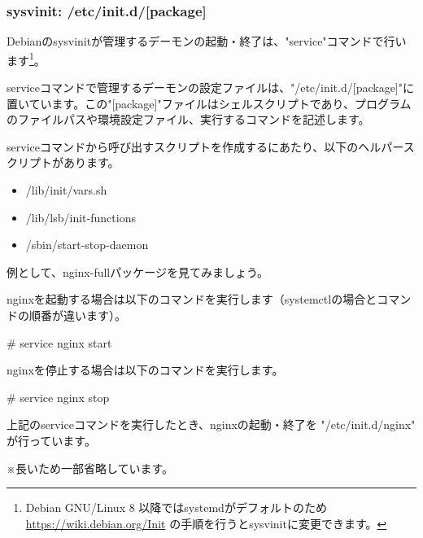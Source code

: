 \documentclass[mingoth,a4paper]{jsarticle}
\begin{document}
\subsubsection{sysvinit: /etc/init.d/[package]}

Debianのsysvinitが管理するデーモンの起動・終了は、"service"コマンドで行います\footnote{Debian GNU/Linux 8 以降ではsystemdがデフォルトのため \url{https://wiki.debian.org/Init} の手順を行うとsysvinitに変更できます。}。


serviceコマンドで管理するデーモンの設定ファイルは、"/etc/init.d/[package]"に置いています。この"[package]"ファイルはシェルスクリプトであり、プログラムのファイルパスや環境設定ファイル、実行するコマンドを記述します。


serviceコマンドから呼び出すスクリプトを作成するにあたり、以下のヘルパースクリプトがあります。

\begin{itemize}
  \item /lib/init/vars.sh
  \item /lib/lsb/init-functions
  \item /sbin/start-stop-daemon
\end{itemize}


例として、nginx-fullパッケージを見てみましょう。


nginxを起動する場合は以下のコマンドを実行します（systemctlの場合とコマンドの順番が違います）。

\begin{commandline}
# service nginx start
\end{commandline}

nginxを停止する場合は以下のコマンドを実行します。

\begin{commandline}
# service nginx stop
\end{commandline}


上記のserviceコマンドを実行したとき、nginxの起動・終了を "/etc/init.d/nginx" が行っています。

※長いため一部省略しています。
\end{document}
